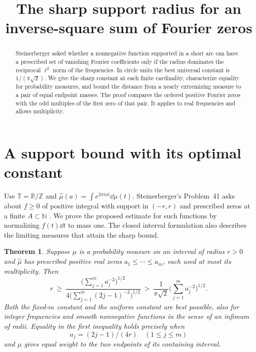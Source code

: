 \documentclass[11pt]{article}
\title{The sharp support radius for an inverse-square sum of Fourier zeros}
\author{}\date{}
\newtheorem{theorem}{Theorem}
\newcommand{\R}{\mathbb R}\newcommand{\Z}{\mathbb Z}
\begin{document}
\maketitle\vspace{-2em}
\begin{abstract}
Steinerberger asked whether a nonnegative function supported in a short arc can have a prescribed set of vanishing Fourier coefficients only if the radius dominates the reciprocal $\ell^2$ norm of the frequencies. In circle units the best universal constant is $1/(\pi\sqrt2)$. We give the sharp constant at each finite cardinality, characterize equality for probability measures, and bound the distance from a nearly extremizing measure to a pair of equal endpoint masses. The proof compares the ordered positive Fourier zeros with the odd multiples of the first zero of that pair. It applies to real frequencies and allows multiplicity.
\end{abstract}

\section{A support bound with its optimal constant}

Use $\mathbb T=\R/\Z$ and $\widehat\mu(a)=\int e^{2\pi iat}\dd\mu(t)$. Steinerberger's Problem~41 asks about $f\ge0$ of positive integral with support in $(-r,r)$ and prescribed zeros at a finite $A\subset\mathbb N$ \cite{Steinerberger}. We prove the proposed estimate for such functions by normalizing $f(t)\dd t$ to mass one. The closed interval formulation also describes the limiting measures that attain the sharp bound.

\begin{theorem}\label{thm:main}
Suppose $\mu$ is a probability measure on an interval of radius $r>0$ and $\widehat\mu$ has prescribed positive real zeros $a_1\le\cdots\le a_m$, each used at most its multiplicity. Then
\begin{equation}\label{eq:main}
 r\ \ge\ \frac{\bigl(\sum_{j=1}^m a_j^{-2}\bigr)^{1/2}}
 {4\bigl(\sum_{j=1}^m(2j-1)^{-2}\bigr)^{1/2}}
 \ >\ \frac{1}{\pi\sqrt2}\biggl(\sum_{j=1}^m a_j^{-2}\biggr)^{1/2}.
\end{equation}
Both the fixed-$m$ constant and the uniform constant are best possible, also for integer frequencies and smooth nonnegative functions in the sense of an infimum of radii. Equality in the first inequality holds precisely when
\[
 a_j=(2j-1)/(4r)\quad(1\le j\le m)
\]
and $\mu$ gives equal weight to the two endpoints of its containing interval.
\end{theorem}
\end{document}
